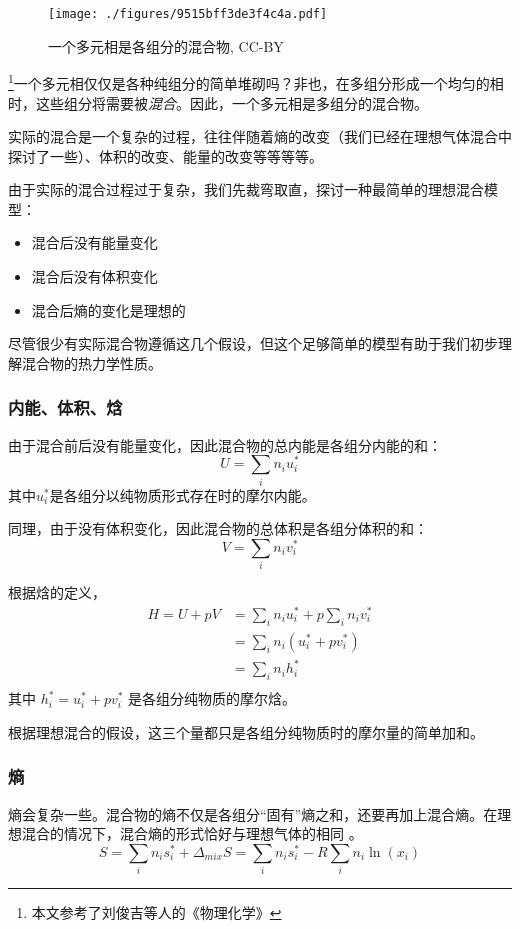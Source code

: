 

\begin{figure}[ht]
\centering
\texttt{[image: ./figures/9515bff3de3f4c4a.pdf]}
\caption{一个多元相是各组分的混合物, CC-BY} \label{fig_IMCPTV_1}
\end{figure}

\footnote{本文参考了刘俊吉等人的《物理化学》}一个多元相仅仅是各种纯组分的简单堆砌吗？非也，在多组分形成一个均匀的相时，这些组分将需要被\textsl{混合}。因此，一个多元相是多组分的混合物。

实际的混合是一个复杂的过程，往往伴随着熵的改变（我们已经在理想气体混合中探讨了一些）、体积的改变、能量的改变等等等等。

由于实际的混合过程过于复杂，我们先裁弯取直，探讨一种最简单的理想混合模型：
\begin{itemize}
\item 混合后没有能量变化
\item 混合后没有体积变化
\item 混合后熵的变化是理想的
\end{itemize}
尽管很少有实际混合物遵循这几个假设，但这个足够简单的模型有助于我们初步理解混合物的热力学性质。

\subsubsection{内能、体积、焓}
由于混合前后没有能量变化，因此混合物的总内能是各组分内能的和：
$$
U = \sum_i n_i u_i^*
$$
其中$u_i^*$是各组分以纯物质形式存在时的摩尔内能。

同理，由于没有体积变化，因此混合物的总体积是各组分体积的和：
$$
V = \sum_i n_i v_i^*
$$

根据焓的定义，
$$
\begin{aligned}
H=U+pV&=\sum_i n_i u_i^*+p\sum_i n_i v_i^*\\
&=\sum_i n_i (u_i^*+p v_i^*)\\
&=\sum_i n_i h_i^*\\
\end{aligned}
$$
其中 $h^*_i = u_i^* + p v_i^*$ 是各组分纯物质的摩尔焓。

根据理想混合的假设，这三个量都只是各组分纯物质时的摩尔量的简单加和。

\subsubsection{熵}
熵会复杂一些。混合物的熵不仅是各组分“固有”熵之和，还要再加上混合熵。在理想混合的情况下，混合熵的形式恰好与理想气体的相同 。%
$$S = \sum_i n_i s_i^* + \Delta_{mix} S = \sum_i n_i s_i^* - R \sum_i n_i \ln (x_i) $$

